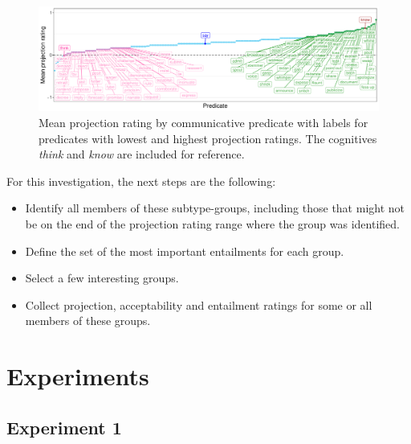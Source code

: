 \documentclass[11pt,fleqn]{article}
\newcommand{\6}{\mbox{$[\hspace*{-.6mm}[$}}
\newcommand{\9}{\mbox{$]\hspace*{-.6mm}]$}}
\begin{document}
\begin{figure}[H]
	\centering
	\includegraphics[width=1\textwidth]{projection-by-communicative-extremes-41-44}
	\caption{Mean projection rating by communicative predicate with labels for predicates with lowest and highest projection ratings. The cognitives \emph{think} and \emph{know} are included for reference.}
	\label{projcommextr}
\end{figure}

\noindent For this investigation, the next steps are the following:
\begin{itemize}
	\item Identify all members of these subtype-groups, including those that might not be on the end of the projection rating range where the group was identified.
	\item Define the set of the most important entailments for each group.
	\item Select a few interesting groups.
	\item Collect projection, acceptability and entailment ratings for some or all members of these groups.
\end{itemize}


\section{Experiments}
\subsection{Experiment 1}
\end{document}
